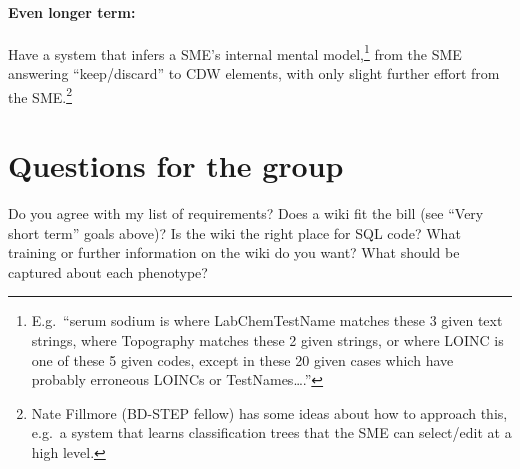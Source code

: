 \documentclass{tufte-handout}
\begin{document}
\paragraph{Even longer term:}
Have a system that infers a SME's internal mental
model,\footnote{E.g.\ ``serum sodium is where LabChemTestName matches
  these 3 given text strings, where Topography matches these 2 given
  strings, or where LOINC is one of these 5 given codes, except in
  these 20 given cases which have probably erroneous LOINCs or
  TestNames\ldots{}.''} from the SME answering ``keep/discard'' to CDW
elements, with only slight further effort from the SME.\footnote{Nate
  Fillmore (BD-STEP fellow) has some ideas about how to approach this,
  e.g.\ a system that learns classification trees that the SME can
  select/edit at a high level.}

\section{Questions for the group}

Do you agree with my list of requirements? Does a wiki fit the bill
(see ``Very short term'' goals above)? Is the wiki the right place for
SQL code? What training or further information on the wiki do you
want? What should be captured about each phenotype?
\end{document}
